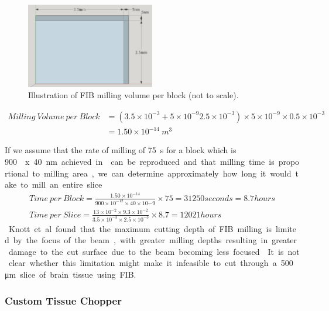 \documentclass[a4paper, 11pt]{article}
\numberwithin{equation}{section}
\begin{document}
	\begin{figure}
		\centering
		\includegraphics[width=0.5\textwidth]{brainblock}
		\caption{Illustration of FIB milling volume per block (not to scale).}
	\end{figure}
	
	\begin{align}
	Milling\ Volume\ per\ Block &= (3.5\times10^{-3} + 5\times10^{-9}  2.5\times10^{-3}) \times 5\times10^{-9} \times 0.5\times10^{-3} \nonumber \\
	&= 1.50\times10^{-14}\ m^3  
	\end{align}
	
	If we assume that the rate of milling of \SI{75}{\second} for a block which is \SI{900}{\micro\meter\square} x \SI{40}{\nano\meter} achieved in \cite{knott2008serial} can be reproduced and that milling time is proportional to milling area, we can determine approximately how long it would take to mill an entire slice.
	
	\begin{align}
	Time\ per\ Block = \frac{1.50\times10^{-14}}{900\times10^{-12} \times 40\times10{-9}} \times 75 = 31250 seconds = 8.7hours \\
	Time\ per\ Slice = \frac{13\times10^{-2} \times 9.3\times10^{-2}}{3.5\times10^{-3} \times 2.5\times10^{-3}} \times 8.7 = 12021hours
	\end{align}
	
	Knott et al  found that the maximum cutting depth of FIB milling is limited by the focus of the beam, with greater milling depths resulting in greater damage to the cut surface due to the beam becoming less focused \cite{Knott2011}. It is not clear whether this limitation might make it infeasible to cut through a \SI{500}{\micro\meter} slice of brain tissue using FIB.
	
	\subsubsection{Custom Tissue Chopper}
	\label{sectioning_smaller_tissuechopper}
	
\end{document}

